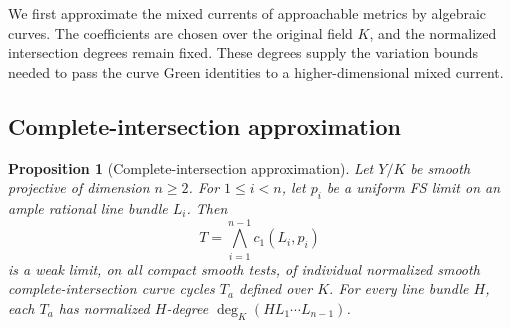 \documentclass[11pt]{amsart}
\newtheorem{proposition}[theorem]{Proposition}
\theoremstyle{definition}
\theoremstyle{remark}
\numberwithin{equation}{section}
\begin{document}
We first approximate the mixed currents of approachable metrics by
algebraic curves. The coefficients are chosen over the original field
\(K\), and the normalized intersection degrees remain fixed. These
degrees supply the variation bounds needed to pass the curve Green
identities to a higher-dimensional mixed current.

\subsection{Complete-intersection approximation}
\label{subsec:curve-approximation}
\begin{proposition}[Complete-intersection approximation]
\label{prop:curve-approximation}
Let \(Y/K\) be smooth projective of dimension \(n\geq2\). For
\(1\leq i<n\), let \(p_i\) be a uniform FS limit on an ample rational
line bundle \(L_i\). Then
\[
 T=\bigwedge_{i=1}^{n-1}c_1(L_i,p_i)
\]
is a weak limit, on all compact smooth tests, of individual normalized
smooth complete-intersection curve cycles \(T_a\) defined over \(K\).
For every line bundle \(H\), each \(T_a\) has normalized \(H\)-degree
\(\deg_K(HL_1\cdots L_{n-1})\).
\end{proposition}
\end{document}

